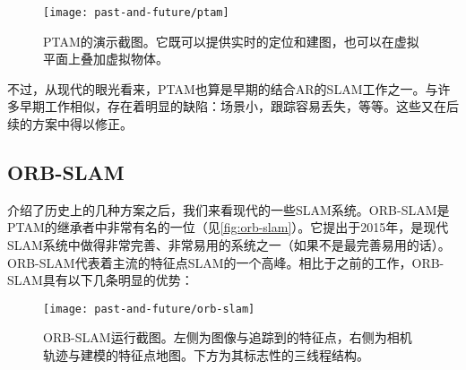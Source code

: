 \begin{figure}[!ht]
	\centering
	\texttt{[image: past-and-future/ptam]}
	\caption{PTAM的演示截图。它既可以提供实时的定位和建图，也可以在虚拟平面上叠加虚拟物体。}
	\label{fig:ptam}
\end{figure}

\clearpage
不过，从现代的眼光看来，PTAM也算是早期的结合AR的SLAM工作之一。与许多早期工作相似，存在着明显的缺陷：场景小，跟踪容易丢失，等等。这些又在后续的方案中得以修正。

\subsection{ORB-SLAM}

介绍了历史上的几种方案之后，我们来看现代的一些SLAM系统。ORB-SLAM是PTAM的继承者中非常有名的一位\textsuperscript{\cite{Mur-Artal2015}}（见\autoref{fig:orb-slam}）。它提出于2015年，是现代SLAM系统中做得非常完善、非常易用的系统之一（如果不是最完善易用的话）。ORB-SLAM代表着主流的特征点SLAM的一个高峰。相比于之前的工作，ORB-SLAM具有以下几条明显的优势：

\begin{figure}[!ht]
	\centering
	\texttt{[image: past-and-future/orb-slam]}
	\caption{ORB-SLAM运行截图。左侧为图像与追踪到的特征点，右侧为相机轨迹与建模的特征点地图。下方为其标志性的三线程结构。}
	\label{fig:orb-slam}
\end{figure}

